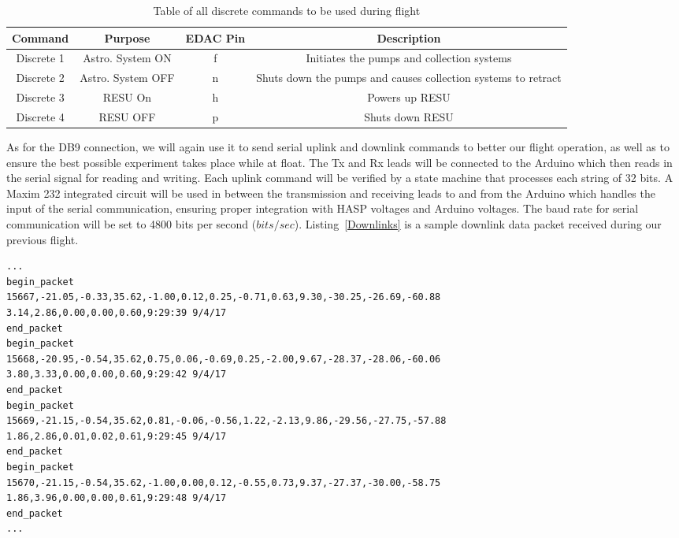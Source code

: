 \begin{table}[!ht]
\centering
\caption{Table of all discrete commands to be used during flight} 
\label{tab:Dis-Commands}
\bigskip
\begin{tabular}{|c|c|c|c|}
\hline
\multicolumn{1}{|c|}{\bfseries Command} & \multicolumn{1}{c|}{\bfseries Purpose} &  \multicolumn{1}{c|}{\bfseries EDAC Pin} & \multicolumn{1}{c|}{\bfseries Description} \\
\hline
    Discrete 1     	& Astro. System ON 	& f	 & Initiates the pumps and collection systems   \\ \hline 
    Discrete 2    	& Astro. System OFF 	& n	 &  Shuts down the pumps and causes collection systems to retract  \\ \hline
    Discrete 3  	& RESU On 	& h	 & Powers up RESU   \\ \hline 
    Discrete 4 		& RESU OFF 	& p	 & Shuts down RESU   \\ \hline
\end{tabular}
\medskip
\end{table}




As for the DB9 connection, we will again use it to send serial uplink and downlink commands to better our flight operation, as well as to ensure the best possible experiment takes place while at float.  The Tx and Rx leads will be connected to the Arduino which then reads in the serial signal for reading and writing.  Each uplink command will be verified by a state machine that processes each string of \num{32} bits.  A Maxim 232 integrated circuit will be used in between the transmission and receiving leads to and from the Arduino which handles the input of the serial communication, ensuring proper integration with HASP voltages and Arduino voltages.  The baud rate for serial communication will be set to 4800 bits per second ($bits/sec$). Listing~\ref{Downlinks} is a sample downlink data packet received during our previous flight.

\lstset{basicstyle=\small, numbers=left, xleftmargin=2em, frame=tb, label = Downlinks, framexleftmargin=1.5em}
\begin{lstlisting}[caption = Sample of downlinked data packets ID: 15667 - 15670 from SORA 2017~\cite{SORA}.]
...
begin_packet
15667,-21.05,-0.33,35.62,-1.00,0.12,0.25,-0.71,0.63,9.30,-30.25,-26.69,-60.88
3.14,2.86,0.00,0.00,0.60,9:29:39 9/4/17
end_packet
begin_packet
15668,-20.95,-0.54,35.62,0.75,0.06,-0.69,0.25,-2.00,9.67,-28.37,-28.06,-60.06
3.80,3.33,0.00,0.00,0.60,9:29:42 9/4/17
end_packet
begin_packet
15669,-21.15,-0.54,35.62,0.81,-0.06,-0.56,1.22,-2.13,9.86,-29.56,-27.75,-57.88
1.86,2.86,0.01,0.02,0.61,9:29:45 9/4/17
end_packet
begin_packet
15670,-21.15,-0.54,35.62,-1.00,0.00,0.12,-0.55,0.73,9.37,-27.37,-30.00,-58.75
1.86,3.96,0.00,0.00,0.61,9:29:48 9/4/17
end_packet
...
\end{lstlisting}
\medskip

